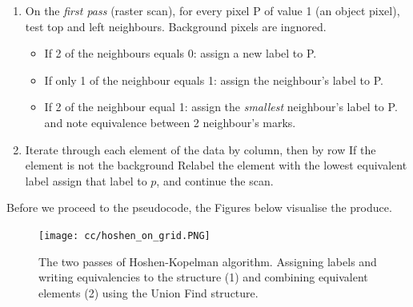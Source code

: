 \documentclass[a4paper]{article}
\begin{document}
\begin{enumerate}
    \item On the \textit{first pass} (raster scan), for every pixel P of value 1 (an object pixel), test top and left
neighbours. Background pixels are ingnored.
    \begin{itemize}
        \item If 2 of the neighbours equals 0: assign a new label to P.
        \item If only 1 of the neighbour equals 1: assign the neighbour's label to P.
        \item If 2 of the neighbour equal 1: assign the \textit{smallest} neighbour's label to P. and note equivalence between 2 neighbour’s marks.
    \end{itemize}
    \item Iterate through each element of the data by column, then by row
If the element is not the background
Relabel the element with the lowest equivalent label
assign that label to $p$, and continue the scan.
\end{enumerate}
Before we proceed to the pseudocode, the Figures below visualise the produce.
\begin{figure}[H]
    \centering
    \texttt{[image: cc/hoshen\_on\_grid.PNG]}
    \caption{The two passes of Hoshen-Kopelman algorithm. Assigning labels and writing equivalencies to the structure (1) and combining equivalent elements (2) using the Union Find structure.}
\end{figure}
\end{document}
